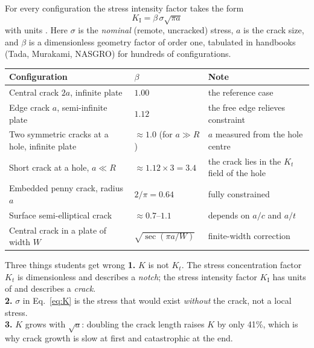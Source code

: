 \documentclass[11pt,a4paper]{article}
\begin{document}
For every configuration the stress intensity factor takes the form
\begin{equation}
  \boxed{\;K_{\mathrm{I}}=\beta\,\sigma\sqrt{\pi a}\;}
  \label{eq:K}
\end{equation}
with units \si{\MParm}. Here $\sigma$ is the \emph{nominal} (remote, uncracked) stress, $a$ is the crack size, and $\beta$ is a dimensionless geometry factor of order one, tabulated in handbooks (Tada, Murakami, NASGRO) for hundreds of configurations.

\begin{center}\small
\begin{tabular}{@{}llp{6.2cm}@{}}
\toprule
Configuration & $\beta$ & Note \\
\midrule
Central crack $2a$, infinite plate & $1.00$ & the reference case \\
Edge crack $a$, semi-infinite plate & $1.12$ & the free edge relieves constraint \\
Two symmetric cracks at a hole, infinite plate & $\approx1.0$ (for $a\gg R$) & $a$ measured from the hole centre \\
Short crack at a hole, $a\ll R$ & $\approx1.12\times3=3.4$ & the crack lies in the $K_t$ field of the hole \\
Embedded penny crack, radius $a$ & $2/\pi=0.64$ & fully constrained \\
Surface semi-elliptical crack & $\approx0.7$--$1.1$ & depends on $a/c$ and $a/t$ \\
Central crack in a plate of width $W$ & $\sqrt{\sec(\pi a/W)}$ & finite-width correction \\
\bottomrule
\end{tabular}
\end{center}

\begin{keybox}{Three things students get wrong}
\textbf{1.} $K$ is not $K_t$. The stress concentration factor $K_t$ is dimensionless and describes a \emph{notch}; the stress intensity factor $K_{\mathrm{I}}$ has units of \si{\MParm} and describes a \emph{crack}. \\
\textbf{2.} $\sigma$ in Eq.~\eqref{eq:K} is the stress that would exist \emph{without} the crack, not a local stress. \\
\textbf{3.} $K$ grows with $\sqrt{a}$: doubling the crack length raises $K$ by only 41\%, which is why crack growth is slow at first and catastrophic at the end.
\end{keybox}
\end{document}
